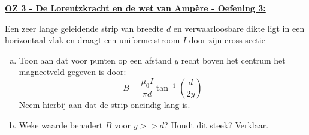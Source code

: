 \textbf{\underline{OZ 3 - De Lorentzkracht en de wet van Ampère - Oefening 3:}}
\vspace{0.5cm}


Een zeer lange geleidende strip van breedte $d$ en verwaarloosbare dikte ligt in een horizontaal vlak en draagt een uniforme stroom $I$ door zijn cross sectie
\begin{enumerate}[(a)]
    \item 
        Toon aan dat voor punten op een afstand $y$ recht boven het centrum het magneetveld gegeven is door:
        \begin{equation*}
            B = \dfrac{\mu_0I}{\pi d}\tan^{-1}\left(\dfrac{d}{2y}\right)
        \end{equation*}
        Neem hierbij aan dat de strip oneindig lang is.
    \item 
        Weke waarde benadert $B$ voor $y >> d$? Houdt dit steek? Verklaar.
\end{enumerate}

